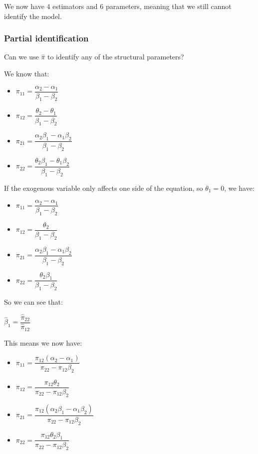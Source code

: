 We now have \(4\) estimators and \(6\) parameters, meaning that we still cannot identify the model.

\subsubsection{Partial identification}

Can we use \(\hat \pi \) to identify any of the structural parameters?

We know that:

\begin{itemize}
\item \(\pi_{11} =\dfrac{\alpha_2 -\alpha_1 }{\beta_1-\beta_2}\)
\item \(\pi_{12} =\dfrac{\theta_2-\theta_1}{\beta_1-\beta_2}\)
\item \(\pi_{21} =\dfrac{\alpha_2\beta_1-\alpha_1\beta_2}{\beta_1-\beta_2}\)
\item \(\pi_{22} =\dfrac{\theta_2\beta_1-\theta_1\beta_2}{\beta_1-\beta_2} \)
\end{itemize}

If the exogenous variable only affects one side of the equation, so \(\theta_1=0\), we have:

\begin{itemize}
\item \(\pi_{11} =\dfrac{\alpha_2 -\alpha_1 }{\beta_1-\beta_2}\)
\item \(\pi_{12} =\dfrac{\theta_2}{\beta_1-\beta_2}\)
\item \(\pi_{21} =\dfrac{\alpha_2\beta_1-\alpha_1\beta_2}{\beta_1-\beta_2}\)
\item \(\pi_{22} =\dfrac{\theta_2\beta_1}{\beta_1-\beta_2} \)
\end{itemize}

So we can see that:

\(\hat \beta_1 = \dfrac{\hat \pi_{22}}{\hat \pi_{12}}\)

This means we now have:

\begin{itemize}
\item \(\pi_{11} =\dfrac{\pi_{12}(\alpha_2 -\alpha_1 )}{\pi_{22}-\pi_{12}\beta_2}\)
\item \(\pi_{12} =\dfrac{\pi_{12}\theta_2}{\pi_{22}-\pi_{12}\beta_2}\)
\item \(\pi_{21} =\dfrac{\pi_{12}(\alpha_2\beta_1-\alpha_1\beta_2)}{\pi_{22}-\pi_{12}\beta_2}\)
\item \(\pi_{22} =\dfrac{\pi_{12}\theta_2\beta_1}{\pi_{22}-\pi_{12}\beta_2}\)
\end{itemize}

